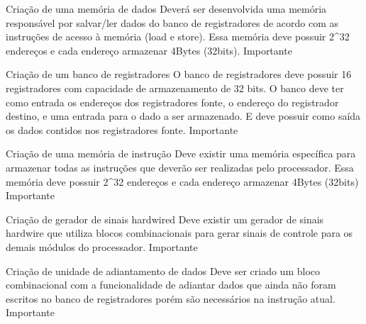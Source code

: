 \documentclass{report}
\begin{document}
\begin{functional}
       \requirement
      {Criação de uma memória de dados}
      {Deverá ser desenvolvida uma memória responsável por salvar/ler dados do banco de registradores de acordo com as instruções de acesso à memória (load e store). Essa memória deve possuir 2\^{}32 endereços e cada endereço armazenar 4Bytes (32bits).}
      {Importante}
      
       \requirement
      {Criação de um banco de registradores}
      {O banco de registradores deve possuir 16 registradores com capacidade de armazenamento de 32 bits. O banco deve ter como entrada os endereços dos registradores fonte, o endereço do registrador destino, e uma entrada para o dado a ser armazenado. E deve possuir como saída os dados contidos nos registradores fonte.}
      {Importante}
      
       \requirement
      {Criação de uma memória de instrução}
      {Deve existir uma memória específica para armazenar todas as instruções que deverão ser realizadas pelo processador. Essa memória deve possuir 2\^{}32 endereços e cada endereço armazenar 4Bytes (32bits)}
      {Importante}
      
      \requirement
      {Criação de gerador de sinais hardwired}
      {Deve existir um gerador de sinais hardwire que utiliza blocos combinacionais para gerar sinais de controle para os demais módulos do processador.}
      {Importante}
      
      \requirement
      {Criação de unidade de adiantamento de dados}
      {Deve ser criado um bloco combinacional com a funcionalidade de adiantar dados que ainda não foram escritos no banco de registradores porém são necessários na instrução atual.}
      {Importante}
    
      \end{functional}
      
\end{document}
